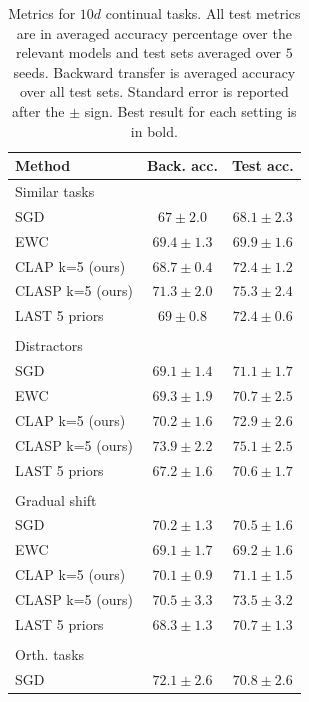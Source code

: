 \documentclass{article}
\theoremstyle{plain}
\theoremstyle{definition}
\theoremstyle{remark}
\begin{document}
\begin{table}[ht!]
\caption{Metrics for $10d$ continual tasks. All test metrics are in averaged accuracy percentage over the relevant models and test sets averaged over $5$ seeds. Backward transfer is averaged accuracy over all test sets. Standard error is reported after the $\pm$ sign. Best result for each setting is in bold. }
\vskip 0.15in
\begin{center}
\begin{small}
\begin{sc}
\begin{tabular}{lcc}
\toprule
Method & Back. acc. & Test acc. \\
\midrule
Similar tasks & & \\
\midrule
SGD    & $67\pm 2.0$ & $68.1\pm  2.3$ \\
EWC & $69.4\pm 1.3$ & $69.9 \pm 1.6$ \\
CLAP k=5 (ours)    & $68.7 \pm 0.4$ & $72.4 \pm 1.2$ \\
CLASP k=5 (ours)    & $\mathbf{71.3} \pm 2.0$& $\mathbf{75.3} \pm 2.4$       \\
LAST 5 priors    & $69\pm 0.8$& $72.4\pm 0.6$        \\
\\Distractors & & \\
\midrule
SGD    & $69.1\pm 1.4$ & $71.1\pm  1.7$ \\
EWC & $69.3\pm 1.9$ & $70.7 \pm 2.5$ \\
CLAP k=5 (ours)    & $70.2 \pm 1.6$ & $72.9 \pm 2.6$ \\
CLASP k=5 (ours)    & $\mathbf{73.9} \pm 2.2$& $\mathbf{75.1} \pm 2.5$       \\
LAST 5 priors    & $67.2\pm 1.6$& $70.6\pm 1.7$    \\
  \\Gradual shift & & \\
\midrule
SGD    & $70.2\pm 1.3$ & $70.5\pm  1.6$ \\
EWC & $69.1\pm 1.7$ & $69.2 \pm 1.6$ \\
CLAP k=5 (ours)    & $70.1 \pm 0.9$ & $71.1 \pm 1.5$ \\
CLASP k=5 (ours)    & $\mathbf{70.5} \pm 3.3$& $\mathbf{73.5} \pm 3.2$       \\
LAST 5 priors    & $68.3\pm 1.3$& $70.7\pm 1.3$    \\
 \\Orth. tasks & & \\
\midrule
SGD    & $\mathbf{72.1}\pm 2.6$ & $70.8\pm  2.6$ \\

\end{tabular}
\end{sc}
\end{small}
\end{center}
\end{table}
\end{document}
